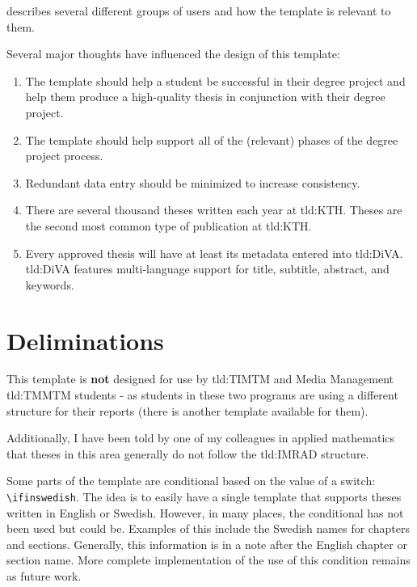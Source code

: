  describes several different groups of users and how the template is relevant to them.

Several major thoughts have influenced the design of this template:
\begin{enumerate}[leftmargin=*, label=\textbf{Thought \arabic*}, ref={Thought \arabic*}]
    \item \label{thought:helpStudent} The template should help a student be successful in their degree project and help them produce a high-quality thesis in conjunction with their degree project.
    
    \item \label{thought:process} The template should help support all of the (relevant) phases of the degree project process.
    
    \item \label{thought:reducingDataEntry} Redundant data entry should be minimized to increase consistency.
    
    \item \label{thought:volume} There are several thousand theses written each year at \gls{tld:KTH}. Theses are the second most common type of publication at \gls{tld:KTH}.
    
    \item \label{thought:inDiVA} Every approved thesis will have at least its metadata entered into \gls{tld:DiVA}. \gls{tld:DiVA} features multi-language support for title, subtitle, abstract, and keywords.
\end{enumerate}

\section{Deliminations}

This template is \textbf{not} designed for use by \gls{tld:TIMTM} and Media Management \gls{tld:TMMTM} students - as students in these two programs are using a different structure for their reports (there is another template available for them).

Additionally, I have been told by one of my colleagues in applied mathematics that theses in this area generally do not follow the \gls{tld:IMRAD} structure.

Some parts of the template are conditional based on the value of a switch: \texttt{\textbackslash ifinswedish}. The idea is to easily have a single template that supports theses written in English or Swedish. However, in many places, the conditional has not been used but could be. Examples of this include the Swedish names for chapters and sections. Generally, this information is in a note after the English chapter or section name. More complete implementation of the use of this condition remains as future work.

